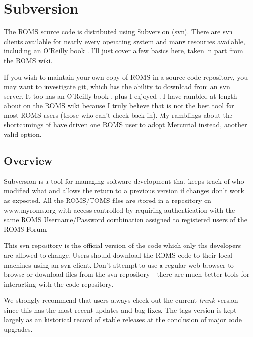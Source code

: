 \section{Subversion}
\label{Svn}

The ROMS source code is distributed using
\href{http://subversion.tigris.org}{Subversion} (svn). There are svn
clients available for nearly every operating system and many
resources available, including an O'Reilly book \citep{SVN}. I'll
just cover a few basics here, taken in part from the
\href{https://www.myroms.org/wiki/index.php/Subversion}{ROMS wiki}.

If you wish to maintain your own copy of ROMS in a source code
repository, you may want to investigate \href{http://git-scm.com/}{git},
which has the ability to download from an svn server. It too has
an O'Reilly book \citep{GIT2}, plus I enjoyed
\citet{GIT1}. I have rambled at length about 
on the \href{https://www.myroms.org/wiki/index.php/ROMS_git}{ROMS
wiki} because I truly believe that  is not the best tool
for most ROMS users (those who can't check back in). My ramblings
about the shortcomings of  have driven one ROMS user to adopt
\href{http://mercurial.selenic.com/}{Mercurial} instead, another
valid option.

\subsection{Overview}
Subversion is a tool for managing software development that keeps
track of who modified what and allows the return to a previous
version if changes don't work as expected. All the ROMS/TOMS files
are stored in a  repository on www.myroms.org with access
controlled by requiring authentication with the same ROMS
Username/Password combination assigned to registered users of the
ROMS Forum.

This svn repository is the official version of the code which only
the developers are allowed to change. Users should download the ROMS
code to their local machines using an svn client. Don't attempt to
use a regular web browser to browse or download files from the svn
repository - there are much better tools for interacting with the
code repository.

We strongly recommend that users always check out the current {\em trunk}
version since this has the most recent updates and bug fixes. The
tags version is kept largely as an historical record of stable
releases at the conclusion of major code upgrades.

